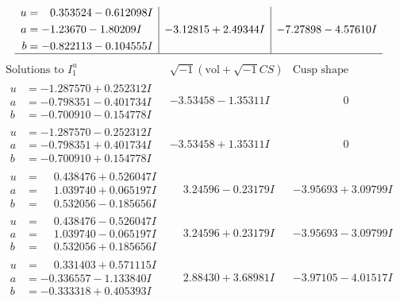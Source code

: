 \documentclass[1p]{elsarticle_modified}
\theoremstyle{definition}
\newcommand{\I}{\sqrt{-1}}
\begin{document}
$$\begin{array}{c|c|c}
\begin{aligned}
u &= \phantom{-}0.353524 - 0.612098 I \\
a &= -1.23670 - 1.80209 I \\
b &= -0.822113 - 0.104555 I\end{aligned}
 & -3.12815 + 2.49344 I & -7.27898 - 4.57610 I\\
 \hline 
 \end{array}$$\newpage$$\begin{array}{c|c|c}  
\text{Solutions to }I^u_{1}& \I (\text{vol} + \sqrt{-1}CS) & \text{Cusp shape}\\
 \hline 
\begin{aligned}
u &= -1.287570 + 0.252312 I \\
a &= -0.798351 - 0.401734 I \\
b &= -0.700910 - 0.154778 I\end{aligned}
 & -3.53458 - 1.35311 I & \phantom{-0.000000 } 0 \\ \hline\begin{aligned}
u &= -1.287570 - 0.252312 I \\
a &= -0.798351 + 0.401734 I \\
b &= -0.700910 + 0.154778 I\end{aligned}
 & -3.53458 + 1.35311 I & \phantom{-0.000000 } 0 \\ \hline\begin{aligned}
u &= \phantom{-}0.438476 + 0.526047 I \\
a &= \phantom{-}1.039740 + 0.065197 I \\
b &= \phantom{-}0.532056 - 0.185656 I\end{aligned}
 & \phantom{-}3.24596 - 0.23179 I & -3.95693 + 3.09799 I \\ \hline\begin{aligned}
u &= \phantom{-}0.438476 - 0.526047 I \\
a &= \phantom{-}1.039740 - 0.065197 I \\
b &= \phantom{-}0.532056 + 0.185656 I\end{aligned}
 & \phantom{-}3.24596 + 0.23179 I & -3.95693 - 3.09799 I \\ \hline\begin{aligned}
u &= \phantom{-}0.331403 + 0.571115 I \\
a &= -0.336557 - 1.133840 I \\
b &= -0.333318 + 0.405393 I\end{aligned}
 & \phantom{-}2.88430 + 3.68981 I & -3.97105 - 4.01517 I \\ \hline\begin{aligned}

\end{aligned}
\end{array}$$
\end{document}
